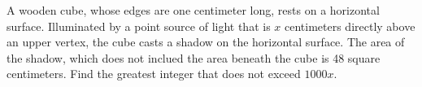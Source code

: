 A wooden cube, whose edges are one centimeter long, rests on a horizontal surface.  Illuminated by a point source of light that is $x$ centimeters directly above an upper vertex, the cube casts a shadow on the horizontal surface.  The area of the shadow, which does not inclued the area beneath the cube is 48 square centimeters.  Find the greatest integer that does not exceed $1000x.$